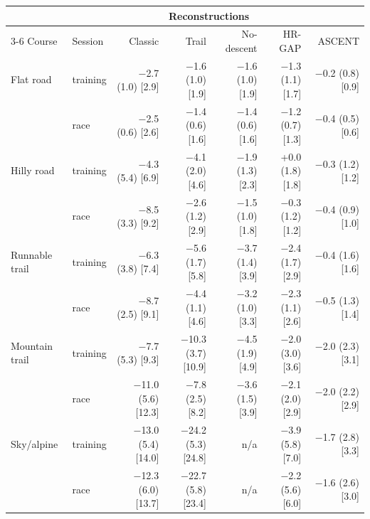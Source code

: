 \begin{tabular}{llrrrrr}
\toprule
 & & \multicolumn{4}{c}{Reconstructions} & \\ \cmidrule(lr){3-6}
Course & Session & Classic & Trail & No-descent & HR-GAP & ASCENT \\
\midrule
Flat road & training & $-$2.7 (1.0) [2.9] & $-$1.6 (1.0) [1.9] & $-$1.6 (1.0) [1.9] & $-$1.3 (1.1) [1.7] & $-$0.2 (0.8) [0.9] \\
 & race & $-$2.5 (0.6) [2.6] & $-$1.4 (0.6) [1.6] & $-$1.4 (0.6) [1.6] & $-$1.2 (0.7) [1.3] & $-$0.4 (0.5) [0.6] \\
\addlinespace[2pt]
Hilly road & training & $-$4.3 (5.4) [6.9] & $-$4.1 (2.0) [4.6] & $-$1.9 (1.3) [2.3] & +0.0 (1.8) [1.8] & $-$0.3 (1.2) [1.2] \\
 & race & $-$8.5 (3.3) [9.2] & $-$2.6 (1.2) [2.9] & $-$1.5 (1.0) [1.8] & $-$0.3 (1.2) [1.2] & $-$0.4 (0.9) [1.0] \\
\addlinespace[2pt]
Runnable trail & training & $-$6.3 (3.8) [7.4] & $-$5.6 (1.7) [5.8] & $-$3.7 (1.4) [3.9] & $-$2.4 (1.7) [2.9] & $-$0.4 (1.6) [1.6] \\
 & race & $-$8.7 (2.5) [9.1] & $-$4.4 (1.1) [4.6] & $-$3.2 (1.0) [3.3] & $-$2.3 (1.1) [2.6] & $-$0.5 (1.3) [1.4] \\
\addlinespace[2pt]
Mountain trail & training & $-$7.7 (5.3) [9.3] & $-$10.3 (3.7) [10.9] & $-$4.5 (1.9) [4.9] & $-$2.0 (3.0) [3.6] & $-$2.0 (2.3) [3.1] \\
 & race & $-$11.0 (5.6) [12.3] & $-$7.8 (2.5) [8.2] & $-$3.6 (1.5) [3.9] & $-$2.1 (2.0) [2.9] & $-$2.0 (2.2) [2.9] \\
\addlinespace[2pt]
Sky/alpine & training & $-$13.0 (5.4) [14.0] & $-$24.2 (5.3) [24.8] & n/a & $-$3.9 (5.8) [7.0] & $-$1.7 (2.8) [3.3] \\
 & race & $-$12.3 (6.0) [13.7] & $-$22.7 (5.8) [23.4] & n/a & $-$2.2 (5.6) [6.0] & $-$1.6 (2.6) [3.0] \\
\bottomrule
\end{tabular}